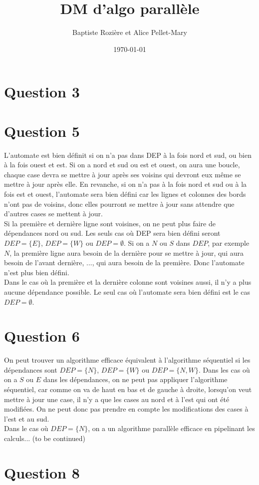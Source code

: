 \documentclass[a4paper,11pt]{article}
\title{DM d'algo parallèle}
\author{Baptiste Rozière et Alice Pellet-Mary}
\date{\today}
\begin{document}
\maketitle

\section*{Question 3}


\section*{Question 5}
L'automate est bien définit si on n'a pas dans DEP à la fois nord et sud, ou bien à la fois ouest et est. Si on a nord et sud ou est et ouest, on aura une boucle, chaque case devra se mettre à jour après ses voisins qui devront eux même se mettre à jour après elle.
En revanche, si on n'a pas à la fois nord et sud ou à la fois est et ouest, l'automate sera bien défini car les lignes et colonnes des bords n'ont pas de voisins, donc elles pourront se mettre à jour sans attendre que d'autres cases se mettent à jour.\\
Si la première et dernière ligne sont voisines, on ne peut plus faire de dépendances nord ou sud. Les seuls cas où DEP sera bien défini seront $DEP = \{E\}$, $DEP = \{W\}$ ou $DEP = \emptyset$. Si on a $N$ ou $S$ dans $DEP$, par exemple $N$, la première ligne aura besoin de la dernière pour se mettre à jour, qui aura besoin de l'avant dernière, ..., qui aura besoin de la première. Donc l'automate n'est plus bien défini.\\
Dans le cas où la première et la dernière colonne sont voisines aussi, il n'y a plus aucune dépendance possible. Le seul cas où l'automate sera bien défini est le cas $DEP = \emptyset$.


\section*{Question 6}
On peut trouver un algorithme efficace équivalent à l'algorithme séquentiel si les dépendances sont $DEP = \{N\}$, $DEP = \{W\}$ ou $DEP = \{N, W\}$. Dans les cas où on a $S$ ou $E$ dans les dépendances, on ne peut pas appliquer l'algorithme séquentiel, car comme on va de haut en bas et de gauche à droite, lorsqu'on veut mettre à jour une case, il n'y a que les cases au nord et à l'est qui ont été modifiées. On ne peut donc pas prendre en compte les modifications des cases à l'est et au sud.\\
Dans le cas où $DEP = \{N\}$, on a un algorithme parallèle efficace en pipelinant les calculs... (to be continued)

\section*{Question 8}
\end{document}
